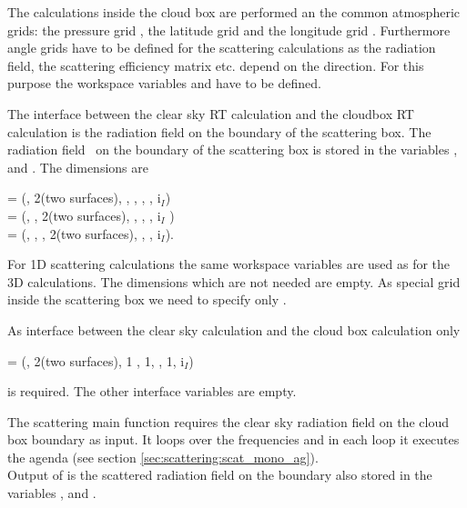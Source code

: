 The calculations inside the cloud box are performed an the common 
atmospheric grids: the pressure grid
, the latitude grid  
and the longitude grid . 
Furthermore angle grids have to be defined for the scattering calculations  
as the radiation field, the scattering efficiency matrix etc. depend
on the direction. For this purpose  the workspace  
variables  and 
have to be defined.

The interface between the clear sky RT calculation and the cloudbox RT
calculation is the radiation field on the boundary of the scattering
box. The radiation field \StoVec\ on the boundary of the scattering box is stored
in the variables ,  and
. The dimensions are 
\begin{center}
   =  (\Frq, 2(two surfaces), \Lat, \Lon, \ScaZa, \ScaAa, i$_I$)\\
  =  (\Frq, \Prs, 2(two surfaces), \Lon, \ScaZa,
\ScaAa, i$_I$ )\\
  =  (\Frq, \Prs, \Lat, 2(two surfaces), \ScaZa,
\ScaAa, i$_I$).
\end{center}

For 1D scattering calculations the same workspace variables are 
used as for the 3D calculations. The dimensions which are not needed are empty. 
As special grid inside the scattering box we need to specify only  
. 

As interface between the clear sky calculation and the cloud box calculation only 
  \begin{center}
   =  (\Frq, 2(two surfaces), 1 , 1, \ScaZa,
1, i$_I$)
\end{center}
is required. The other interface variables are empty. 

\label{sec:scattering:main_function}

The scattering main function  requires the clear sky radiation 
field on the cloud box boundary as input.
It loops over the frequencies and in each loop it executes the agenda 
(see section \ref{sec:scattering:scat_mono_ag}).\\
Output of  is the scattered radiation field on the
boundary also stored in the variables ,  and
.

